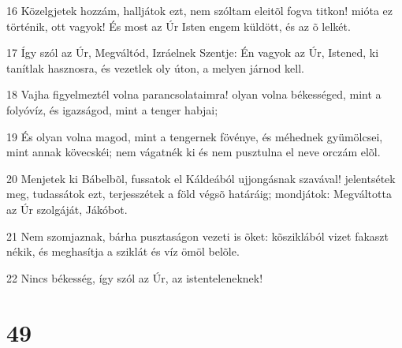 \par 16 Közelgjetek hozzám, halljátok ezt, nem szóltam eleitõl fogva titkon! mióta ez történik, ott vagyok! És most az Úr Isten engem küldött, és az õ lelkét.
\par 17 Így szól az Úr, Megváltód, Izráelnek Szentje: Én vagyok az Úr, Istened, ki tanítlak hasznosra, és vezetlek oly úton, a melyen járnod kell.
\par 18 Vajha figyelmeztél volna parancsolataimra! olyan volna békességed, mint a folyóvíz, és igazságod, mint a tenger habjai;
\par 19 És olyan volna magod, mint a tengernek fövénye, és méhednek gyümölcsei, mint annak kövecskéi; nem vágatnék ki és nem pusztulna el neve orczám elõl.
\par 20 Menjetek ki Bábelbõl, fussatok el Káldeából ujjongásnak szavával! jelentsétek meg, tudassátok ezt, terjesszétek a föld végsõ határáig; mondjátok: Megváltotta  az Úr szolgáját, Jákóbot.
\par 21 Nem szomjaznak, bárha pusztaságon vezeti is õket: kõsziklából vizet fakaszt nékik, és meghasítja a sziklát és víz ömöl belõle.
\par 22 Nincs békesség, így szól az Úr, az istenteleneknek!

\chapter{49}

